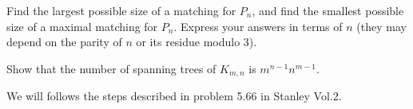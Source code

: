 \documentclass[12pt]{memoir}
\begin{document}
\begin{Ej}[Exercise 1]
    Find the largest possible size
    of a matching for $P_n$, and find the smallest possible size of a maximal matching for $P_n$. Express your
    answers in terms of $n$ (they may depend on the parity of $n$ or its residue modulo 3).
\end{Ej}

\begin{ptcbr}
    
\end{ptcbr}

\begin{Ej}[Exercise 3]
    Show that the number of spanning trees of $K_{m,n}$ is $m^{n-1}n^{m-1}$.
\end{Ej}

We will follows the steps described in problem 5.66 in Stanley Vol.2.
\end{document}
